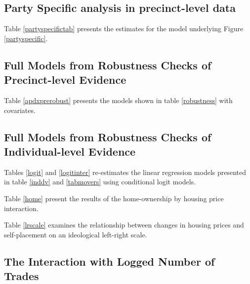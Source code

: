 \documentclass[12pt,a4paper]{article}
\begin{document}
			\newpage
			
			\subsection{Party Specific analysis in precinct-level data} \label{app_partyspec}
			\setcounter{table}{0}
			
			Table \ref{partyspecifictab} presents the estimates for the model underlying Figure \ref{partyspecific}. 
			

			
			
			
			\newpage
			
			\subsection{Full Models from Robustness Checks of Precinct-level Evidence} \label{app_robustpred}
			\setcounter{table}{0}
			
			Table \ref{apdxprerobust} presents the models shown in table \ref{robustness} with covariates.
			
			 
			
			\newpage
			
			\subsection{Full Models from Robustness Checks of Individual-level Evidence} \label{app_robustind}
			
			\setcounter{table}{0}
			
			Tables \ref{logit} and \ref{logitinter} re-estimates the linear regression models presented in table \ref{inddv} and \ref{tabmovers} using conditional logit models.
			
			Table  \ref{home} present the results of the home-ownership by housing price interaction.
			
			Table \ref{lrscale} examines the relationship between changes in housing prices and  self-placement on an ideological left-right scale.
			
			
			
			
			
			
			\newpage
			
			\subsection{The Interaction with Logged Number of Trades} \label{app_interaction}
			\setcounter{table}{0}
			\setcounter{figure}{0}
			
\end{document}
